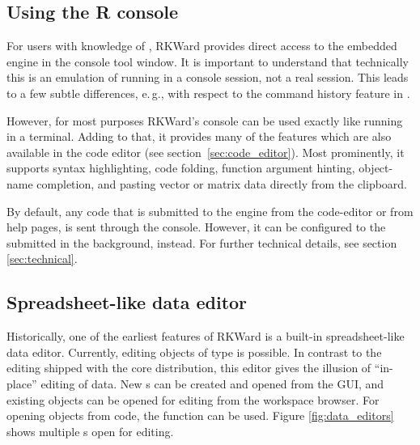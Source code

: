 \subsection{Using the R console}
\label{sec:using_R_console}
For users with knowledge of , RKWard provides direct access to the
embedded  engine in the
 console tool window. It is important to understand that technically this is an
emulation of  running in a console
session, not a real  session. This leads to a few subtle
differences, e.\,g., with respect to the command history feature in
.

However, for most purposes RKWard's  console can be used exactly
like  running in a terminal. Adding to that, it provides many of the
features which are also available in the code editor (see section~\ref{sec:code_editor}).
Most prominently, it supports syntax highlighting, code
folding, function argument hinting, object-name completion, and pasting
vector or matrix data directly from the clipboard.

By default, any code that is submitted to the
 engine from the code-editor or from help
pages, is sent through the  console.
However, it can be configured to the submitted in the background,
instead.
For further technical details, see section \ref{sec:technical}.

\subsection{Spreadsheet-like data editor}
\label{sec:spreadsheet}

Historically, one of the earliest
features of RKWard is a built-in spreadsheet-like data editor.
Currently, editing  objects of type
 is possible. In contrast to the  editing shipped
with the  core distribution, this editor
gives the illusion of ``in-place'' editing of data. New s can
be created and opened from the GUI, and existing objects can be opened
for editing from the workspace browser. For opening objects from
 code, the function  can be used.
Figure \ref{fig:data_editors} shows multiple s open for editing.

